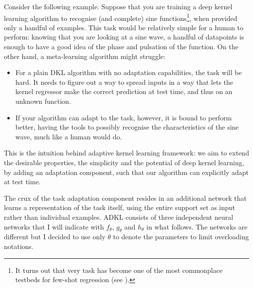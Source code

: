 \documentclass[11pt]{article}
\numberwithin{equation}{subsection}
\begin{document}
Consider the following example. Suppose that you are training a deep kernel learning algorithm to recognise (and complete) sine functions\footnote{It turns out that very task has become one of the most commonplace testbeds for few-shot regression (see ).}, when provided only a handful of examples. This task would be relatively simple for a human to perform: knowing that you are looking at a sine wave, a handful of datapoints is enough to have a good idea of the phase and pulsation of the function.
On the other hand, a meta-learning algorithm might struggle:
\begin{itemize}
  \item For a plain DKL algorithm with no adaptation capabilities, the task will be hard. It needs to figure out a way to spread inputs in a way that lets the kernel regressor make the correct prediction at test time, and thus on an unknown function.
  \item If your algorithm can adapt to the task, however, it is bound to perform better, having the tools to possibly recognise the characteristics of the sine wave, much like a human would do.
\end{itemize}

This is the intuition behind adaptive kernel learning framework: we aim to extend the desirable properties, the simplicity and the potential of deep kernel learning, by adding an adaptation component, such that our algorithm can explicitly adapt at test time.


The crux of the task adaptation component resides in an additional network that learns a representation of the task itself, using the entire support set as input rather than individual examples. ADKL consists of three independent neural networks that I will indicate with $f_\theta$, $g_\theta$ and $h_\theta$ in what follows. The networks are different but I decided to use only $\theta$ to denote the parameters to limit overloading notations.


\end{document}
